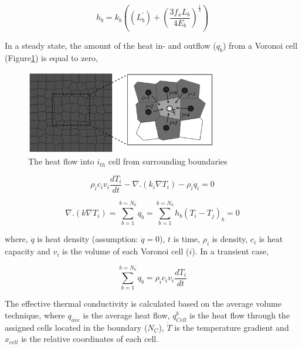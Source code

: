 \begin{equation}
\label{eq:LEM_Thermal_1}
h_b = k_{b} \left( (L_b^\prime)+ \left(\frac{3f_x L_b}{4E_b}\right)^\frac{1}{3} \right)
\end{equation}

In a steady state, the amount of the heat in- and outflow ($q_b$) from a Voronoi cell (Figure\ref{fig:Amir_LEM_Thermal}) is equal to zero,

\begin{figure}[!ht]
\centering
\includegraphics[width=0.75\textwidth]{figures/Amir_LEM_Thermal.png}
\caption{The heat flow into $i_{th}$ cell from surrounding boundaries}
\label{fig:Amir_LEM_Thermal}
\end{figure}

\begin{equation}
\label{eq:LEM_Thermal_2}
\rho_{i}c_{i}v_{i}\frac{dT_{i}}{dt}-\nabla .\left(k_i\nabla T_i\right)-\rho_i{\dot{q}}_i=0
\end{equation}

\begin{equation}
\label{eq:LEM_Thermal_3}
\nabla .\left(k\nabla T_i\right)=\sum_{b=1}^{b=N_b}{q_b}=\sum_{b=1}^{b=N_b}{h_b(T_i - T_j)_b=0}
\end{equation}

where, $\dot{q}$ is heat density (assumption: $\dot{q}=0$), $t$ is time, $\rho_{i}$ is density, $c_{i}$ is heat capacity and $v_{i}$ is the volume of each Voronoi cell ($i$). In a transient case,

\begin{equation}
\label{eq:LEM_Thermal_4}
\sum_{b=1}^{b=N_b}{q_b=}\rho_{i}c_{i}v_{i}\frac{dT_i}{dt}
\end{equation}

The effective thermal conductivity is calculated based on the average volume technique, where $q_{ave}$ is the average heat flow, $q_{Cell}^{b}$ is the heat flow through the assigned cells located in the boundary ($N_C$), $\dot{T}$ is the temperature gradient and  $\hat{x}_{cell}$ is the relative coordinates of each cell.

